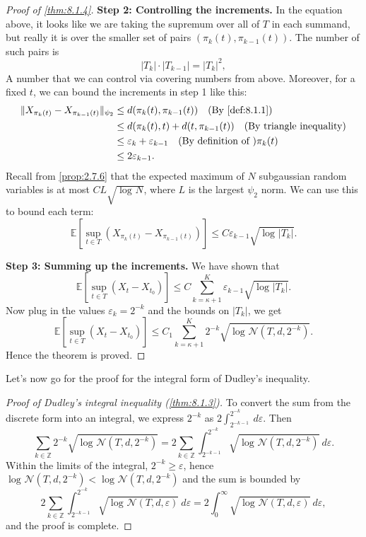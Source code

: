 \begin{proof}[Proof of \cref{thm:8.1.4}]
\textbf{Step 2: Controlling the increments.} In the equation above, it looks like we are taking the supremum 
over all of $T$ in each summand, but really it is over the smaller set of pairs $(\pi_k(t), \pi_{k - 1}(t))$. 
The number of such pairs is 
\[ |T_k| \cdot |T_{k - 1}| = |T_k|^2, \]
A number that we can control via covering numbers from above. Moreover, for a fixed $t$, we can bound the 
increments in step 1 like this: 
\begin{align*}
	\lVert X_{\pi_k(t)} - X_{\pi_{k - 1}(t)} \rVert_{\psi_2} 
	&\leq d(\pi_k(t), \pi_{k - 1}(t)) \quad \text{(By \cref{def:8.1.1})} \\ 
	&\leq d(\pi_k(t), t) + d(t, \pi_{k - 1}(t)) \quad \text{(By triangle inequality)} \\
	&\leq \varepsilon_k + \varepsilon_{k - 1} \quad \text{(By definition of )} \pi_k(t) \\
	&\leq 2 \varepsilon_{k - 1}.
\end{align*}
Recall from \cref{prop:2.7.6} that the expected maximum of $N$ subgaussian random variables is at most 
$CL \sqrt{\log_{}{N}}$, where $L$ is the largest $\psi_2$ norm. We can use this to bound each term: 
\[ \mathbb{E}\left[ \sup_{t \in T}(X_{\pi_k(t)} - X_{\pi_{k - 1}(t)}) \right] 
\leq C \varepsilon_{k - 1} \sqrt{\log_{}{|T_k|}}. \]

\textbf{Step 3: Summing up the increments.} We have shown that 
\[ \mathbb{E}\left[ \sup_{t \in T}(X_t - X_{t_0}) \right] 
\leq C \sum_{k = \kappa + 1}^{K} \varepsilon_{k - 1} \sqrt{\log_{}{|T_k|}}. \]
Now plug in the values $\varepsilon_k = 2^{-k}$ and the bounds on $|T_k|$, we get 
\[ \mathbb{E}\left[ \sup_{t \in T}(X_t - X_{t_0}) \right] 
\leq C_1 \sum_{k = \kappa + 1}^{K} 2^{-k} \sqrt{\log_{}{\mathcal{N}(T, d, 2^{-k})}}. \]
Hence the theorem is proved.
\end{proof}

Let's now go for the proof for the integral form of Dudley's inequality.

\begin{proof}[Proof of Dudley's integral inequality (\cref{thm:8.1.3})]
To convert the sum from the discrete form into an integral, we express $2^{-k}$ as 
$2 \int_{2^{-k-1}}^{2^{-k}}  \ d \varepsilon$. Then 
\[ \sum_{k \in \mathbb{Z}}^{} 2^{-k} \sqrt{\log_{}{\mathcal{N}(T, d, 2^{-k})}} = 
2 \sum_{k \in \mathbb{Z}}^{} \int_{2^{-k-1}}^{2^{-k}} \sqrt{\log_{}{\mathcal{N}(T, d, 2^{-k})}} \ 
d \varepsilon. \]
Within the limits of the integral, $2^{-k} \geq \varepsilon$, hence $\log_{}{\mathcal{N}(T, d, 2^{-k})} 
< \log_{}{\mathcal{N}(T, d, 2^{-k})}$ and the sum is bounded by 
\[ 2 \sum_{k \in \mathbb{Z}}^{} \int_{2^{-k-1}}^{2^{-k}} \sqrt{\log_{}{\mathcal{N}(T, d, \varepsilon)}} \ 
d \varepsilon = 2 \int_{0}^{\infty} \sqrt{\log_{}{\mathcal{N}(T, d, \varepsilon)}} \ d \varepsilon, \]
and the proof is complete.
\end{proof}


